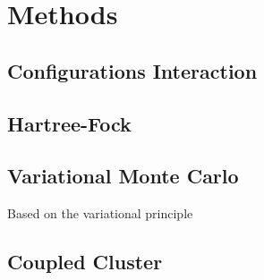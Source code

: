 \section{Methods} \label{sec:methods}
\subsection{Configurations Interaction} \label{subsec:ci}
\subsection{Hartree-Fock} \label{subsec:hf}
\subsection{Variational Monte Carlo} \label{subsec:vmc}
Based on the variational principle
\subsection{Coupled Cluster} \label{subsec:cc}